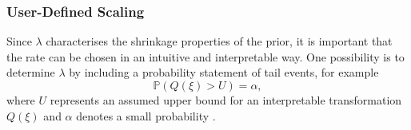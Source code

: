 \subsubsection*{User-Defined Scaling}
Since $\lambda$ characterises the shrinkage properties of the prior, it is important that the rate can be chosen in an intuitive and interpretable way. One possibility is to determine $\lambda$ by including a probability statement of tail events, for example
\begin{equation}
    \mathbb{P}\left(Q\left(\xi\right) > U\right)=\alpha,
\end{equation}
where $U$ represents an assumed upper bound for an interpretable transformation $Q\left(\xi\right)$ and $\alpha$ denotes a small probability \autocite[][]{simpson2017penalising}.
